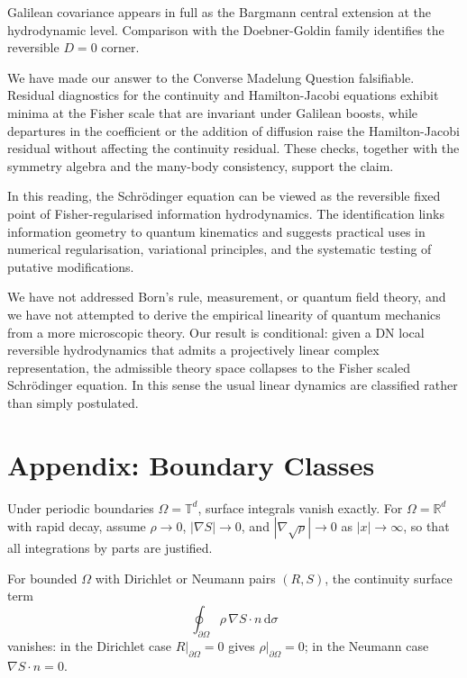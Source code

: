 \documentclass[11pt,a4paper]{article}
\numberwithin{equation}{section}
\theoremstyle{thmcompact}
\theoremstyle{remark}
\begin{document}
Galilean covariance appears in full as the Bargmann central extension at the hydrodynamic level. Comparison with the Doebner-Goldin family identifies the reversible $D=0$ corner.

We have made our answer to the Converse Madelung Question falsifiable. Residual diagnostics for the continuity and Hamilton-Jacobi equations exhibit minima at the Fisher scale that are invariant under Galilean boosts, while departures in the coefficient or the addition of diffusion raise the Hamilton-Jacobi residual without affecting the continuity residual. These checks, together with the symmetry algebra and the many-body consistency, support the claim.

In this reading, the Schrödinger equation can be viewed as the reversible fixed point of Fisher-regularised information hydrodynamics. The identification links information geometry to quantum kinematics and suggests practical uses in numerical regularisation, variational principles, and the systematic testing of putative modifications. 

We have not addressed Born’s rule, measurement, or quantum field theory, and we have not attempted to derive the empirical linearity of quantum mechanics from a more microscopic theory. Our result is conditional: given a DN local reversible hydrodynamics that admits a projectively linear complex representation, the admissible theory space collapses to the Fisher scaled Schrödinger equation. In this sense the usual linear dynamics are classified rather than simply postulated.

\clearpage
\appendix
\renewcommand{\thesection}{\Alph{section}}
\setcounter{section}{0}
	
\section{Appendix: Boundary Classes}
\label{app:boundary}

Under periodic boundaries $\Omega=\mathbb{T}^d$, surface integrals vanish exactly.
For $\Omega=\mathbb{R}^d$ with rapid decay, assume $\rho\to 0$, $|\nabla S|\to 0$, and $|\nabla\sqrt\rho|\to 0$ as $|x|\to\infty$, so that all integrations by parts are justified.

For bounded $\Omega$ with Dirichlet or Neumann pairs $(R,S)$, the continuity surface term
\[
\oint_{\partial\Omega} \rho\,\nabla S\!\cdot\!n\,\mathrm{d}\sigma
\]
vanishes: in the Dirichlet case $R|_{\partial\Omega}=0$ gives $\rho|_{\partial\Omega}=0$; in the Neumann case $\nabla S\!\cdot\!n=0$.
\end{document}
